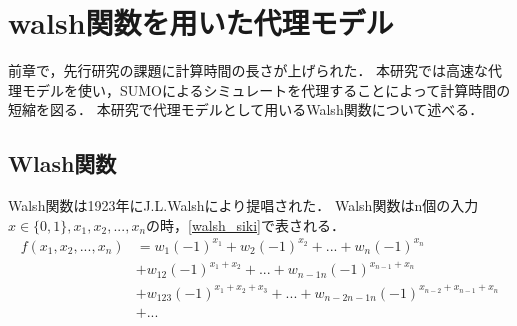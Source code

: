 \documentclass[main]{subfiles}
\begin{document}
\chapter{walsh関数を用いた代理モデル}
    前章で，先行研究の課題に計算時間の長さが上げられた．
    本研究では高速な代理モデルを使い，SUMOによるシミュレートを代理することによって計算時間の短縮を図る．
    本研究で代理モデルとして用いるWalsh関数について述べる．

    \section{Wlash関数}   
    Walsh関数\cite{walsh}は1923年にJ.L.Walshにより提唱された．
    Walsh関数はn個の入力$x \in \{0, 1\}, x_1, x_2, ..., x_n$の時，\ref{walsh_siki}で表される．
    \begin{equation}
        \begin{split}
            f(x_1, x_2, ..., x_n) &= w_1(-1)^{x_1} + w_2(-1)^{x_2} + ... + w_n(-1)^{x_n} \\
            &+ w_{12}(-1)^{x_1+x_2} + ... + w_{n-1n}(-1)^{x_{n-1}+x_n} \\
            &+ w_{123}(-1)^{x_1+x_2+x_3} + ... + w_{n-2n-1n}(-1)^{x_{n-2}+x_{n-1}+x_n} \\
            &+ ...
            \label{walsh_siki}
        \end{split}
    \end{equation}
    
    
\end{document}
